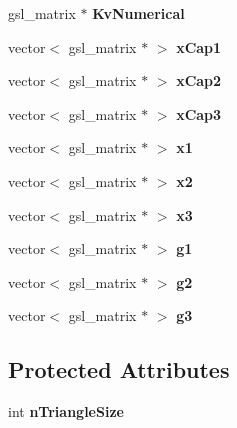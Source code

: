 \begin{DoxyCompactItemize}
\item 
\hypertarget{classLumen_a67749dcf6c36522b7c17e4cb7be6b212}{}gsl\+\_\+matrix $\ast$ {\bfseries Kv\+Numerical}\label{classLumen_a67749dcf6c36522b7c17e4cb7be6b212}

\item 
\hypertarget{classLumen_a0b0be209ab7a789cecbb0725c85dd1b9}{}vector$<$ gsl\+\_\+matrix $\ast$ $>$ {\bfseries x\+Cap1}\label{classLumen_a0b0be209ab7a789cecbb0725c85dd1b9}

\item 
\hypertarget{classLumen_ae11c0b7ebe33d267c45274c7821e0fd6}{}vector$<$ gsl\+\_\+matrix $\ast$ $>$ {\bfseries x\+Cap2}\label{classLumen_ae11c0b7ebe33d267c45274c7821e0fd6}

\item 
\hypertarget{classLumen_abc75889dc462cc569bdf85da2ad8d16a}{}vector$<$ gsl\+\_\+matrix $\ast$ $>$ {\bfseries x\+Cap3}\label{classLumen_abc75889dc462cc569bdf85da2ad8d16a}

\item 
\hypertarget{classLumen_ab15d88c592bdc627f36c89f070724607}{}vector$<$ gsl\+\_\+matrix $\ast$ $>$ {\bfseries x1}\label{classLumen_ab15d88c592bdc627f36c89f070724607}

\item 
\hypertarget{classLumen_af69693b0fb1610cc5f5aee815f350165}{}vector$<$ gsl\+\_\+matrix $\ast$ $>$ {\bfseries x2}\label{classLumen_af69693b0fb1610cc5f5aee815f350165}

\item 
\hypertarget{classLumen_a064ef6067b05537803626771de5a77c6}{}vector$<$ gsl\+\_\+matrix $\ast$ $>$ {\bfseries x3}\label{classLumen_a064ef6067b05537803626771de5a77c6}

\item 
\hypertarget{classLumen_a8dcd3b626910ffadd2fe8290e8a47708}{}vector$<$ gsl\+\_\+matrix $\ast$ $>$ {\bfseries g1}\label{classLumen_a8dcd3b626910ffadd2fe8290e8a47708}

\item 
\hypertarget{classLumen_a721f141482fd7f3a95a21c849ccca13f}{}vector$<$ gsl\+\_\+matrix $\ast$ $>$ {\bfseries g2}\label{classLumen_a721f141482fd7f3a95a21c849ccca13f}

\item 
\hypertarget{classLumen_accde5bf03c47d7d1c85d07438ab20d88}{}vector$<$ gsl\+\_\+matrix $\ast$ $>$ {\bfseries g3}\label{classLumen_accde5bf03c47d7d1c85d07438ab20d88}

\end{DoxyCompactItemize}
\subsection*{Protected Attributes}
\begin{DoxyCompactItemize}
\item 
\hypertarget{classLumen_ad923315f08f43e046e82efc0743afa13}{}int {\bfseries n\+Triangle\+Size}\label{classLumen_ad923315f08f43e046e82efc0743afa13}

\end{DoxyCompactItemize}


